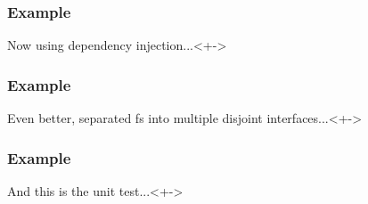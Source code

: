 \begin{frame}
	\frametitle{Example}
	\begin{block}{Now using dependency injection...}<+->
		
	\end{block}
\end{frame}


\begin{frame}
	\frametitle{Example}
	\begin{block}{Even better, separated fs into multiple disjoint interfaces...}<+->
		
	\end{block}
\end{frame}


\begin{frame}
	\frametitle{Example}
	\begin{block}{And this is the unit test...}<+->
		
	\end{block}
\end{frame}

